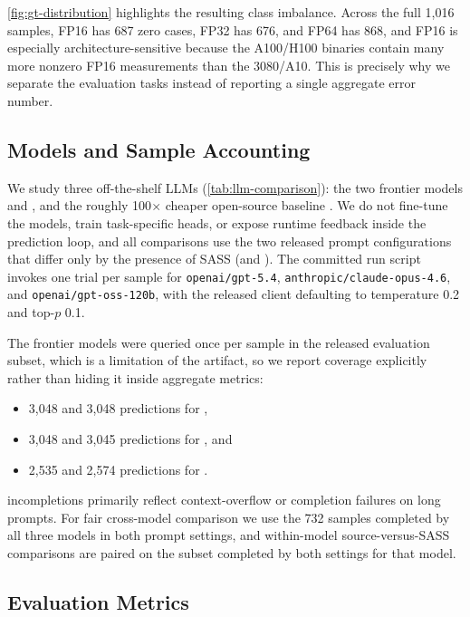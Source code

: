 \autoref{fig:gt-distribution} highlights the resulting class imbalance.
Across the full 1{,}016 samples, FP16 has 687 zero cases, FP32 has 676, and FP64 has 868, and FP16 is especially architecture-sensitive because the A100/H100 binaries contain many more nonzero FP16 measurements than the 3080/A10.
This is precisely why we separate the evaluation tasks instead of reporting a single aggregate error number.

\subsection{Models and Sample Accounting}



We study three off-the-shelf LLMs (\autoref{tab:llm-comparison}): the two frontier models \gptfivefour and \opus, and the roughly 100$\times$ cheaper open-source baseline \gptoss.
We do not fine-tune the models, train task-specific heads, or expose runtime feedback inside the prediction loop, and all comparisons use the two released prompt configurations that differ only by the presence of SASS (\sourceonly and \sourcesass).
The committed run script invokes one trial per sample for \texttt{openai/gpt-5.4}, \texttt{anthropic/claude-opus-4.6}, and \texttt{openai/gpt-oss-120b}, with the released client defaulting to temperature 0.2 and top-$p$ 0.1.

The frontier models were queried once per sample in the released evaluation subset, which is a limitation of the artifact, so we report coverage explicitly rather than hiding it inside aggregate metrics:
\begin{itemize}[leftmargin=1.2em]
  \item 3{,}048 \sourcesass and 3{,}048 \sourceonly predictions for \opus,
  \item 3{,}048 \sourcesass and 3{,}045 \sourceonly predictions for \gptfivefour, and
  \item 2{,}535 \sourcesass and 2{,}574 \sourceonly predictions for \gptoss.
\end{itemize}
\gptoss incompletions primarily reflect context-overflow or completion failures on long prompts.
For fair cross-model comparison we use the 732 samples completed by all three models in both prompt settings, and within-model source-versus-SASS comparisons are paired on the subset completed by both settings for that model.

\subsection{Evaluation Metrics}

